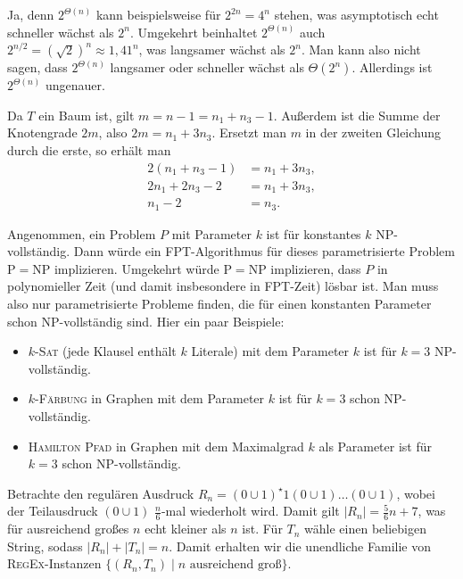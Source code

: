 

\DeclareMathOperator{\vc}{vc}





\subexercise

Ja, denn $2^{\Theta(n)}$ kann beispielsweise für $2^{2n} = 4^n$
stehen, was asymptotisch echt schneller wächst als $2^n$.  Umgekehrt
beinhaltet $2^{\Theta(n)}$ auch
$2^{n/2} = (\sqrt{2})^n \approx 1,41^n$, was langsamer wächst als
$2^n$.  Man kann also nicht sagen, dass $2^{\Theta(n)}$ langsamer oder
schneller wächst als $\Theta(2^n)$.  Allerdings ist $2^{\Theta(n)}$
ungenauer.

\subexercise

Da $T$ ein Baum ist, gilt $m = n-1 = n_1 + n_3 - 1$.  Außerdem ist die
Summe der Knotengrade $2m$, also $2m = n_1 + 3n_3$.  Ersetzt man $m$
in der zweiten Gleichung durch die erste, so erhält man
%
\begin{align*}
  2(n_1 + n_3 - 1) & = n_1 + 3n_3,\\
  2n_1 + 2n_3 - 2 & = n_1 + 3n_3, \\
  n_1 - 2         & = n_3.
\end{align*}

\subexercise

Angenommen, ein Problem $P$ mit Parameter $k$ ist für konstantes $k$
NP-vollständig.  Dann würde ein FPT-Algorithmus für dieses
parametrisierte Problem $\mathrm{P} = \mathrm{NP}$ implizieren.
Umgekehrt würde $\mathrm{P} = \mathrm{NP}$ implizieren, dass $P$ in
polynomieller Zeit (und damit insbesondere in FPT-Zeit) lösbar ist.
Man muss also nur parametrisierte Probleme finden, die für einen
konstanten Parameter schon NP-vollständig sind.  Hier ein paar Beispiele:
%
\begin{itemize}
\item $k$-\textsc{Sat} (jede Klausel enthält $k$ Literale) mit dem
  Parameter $k$ ist für $k = 3$ NP-vollständig.
\item $k$-\textsc{Färbung} in Graphen mit dem Parameter $k$ ist für
  $k = 3$ schon NP-vollständig.
\item \textsc{Hamilton Pfad} in Graphen mit dem Maximalgrad $k$ als
  Parameter ist für $k = 3$ schon NP-vollständig.
\end{itemize}



Betrachte den regulären Ausdruck
$R_n = (0\cup 1)^\star 1 (0\cup 1) \dots (0\cup 1)$, wobei der
Teilausdruck $(0\cup 1)$ $\frac{n}{6}$-mal wiederholt wird.  Damit gilt
$|R_n| = \frac{5}{6}n + 7$, was für ausreichend großes $n$ echt
kleiner als $n$ ist.  Für $T_n$ wähle einen beliebigen String, sodass
$|R_n| + |T_n| = n$.  Damit erhalten wir die unendliche Familie von
\textsc{RegEx}-Instanzen
$\{(R_n, T_n) \mid n \text{ ausreichend groß}\}$.

